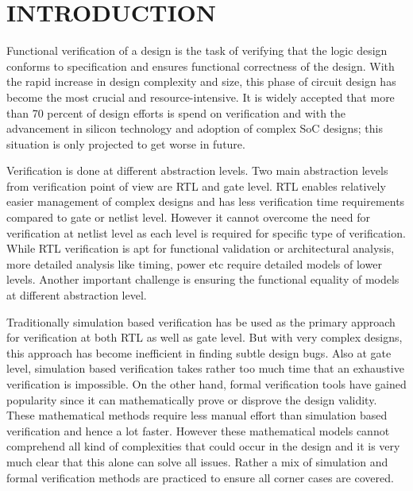 \chapter{INTRODUCTION}

Functional verification of a design is the task of verifying that the logic design conforms to specification and ensures functional correctness of the design.  With the rapid increase in design complexity and size, this phase of circuit design has become the most crucial and resource-intensive. It is widely accepted that more than 70 percent of design efforts is spend on verification and with the advancement in silicon technology and adoption of complex SoC designs; this situation is only projected to get worse in future. 

Verification is done at different abstraction levels. Two main abstraction levels from verification point of view are RTL and gate level. RTL enables relatively easier management of complex designs and has less verification time requirements compared to gate or netlist level. However it cannot overcome the need for verification at netlist level as each level is required for specific type of verification. While RTL verification is apt for functional validation or architectural analysis, more detailed analysis like timing, power etc require detailed models of lower levels. Another important challenge is ensuring the functional equality of models at different abstraction level.  

 Traditionally simulation based verification has be used as the primary approach for verification at both RTL as well as gate level.  But with very complex designs, this approach has become inefficient in finding subtle design bugs. Also at gate level, simulation based verification takes rather too much time that an exhaustive verification is impossible. On the other hand, formal verification tools have gained popularity since it can mathematically prove or disprove the design validity. These mathematical methods require less manual effort than simulation based verification and hence a lot faster. However these mathematical models cannot comprehend all kind of complexities that could occur in the design and it is very much clear that this alone can solve all issues. Rather a mix of simulation and formal verification methods are practiced to ensure all corner cases are covered. 


